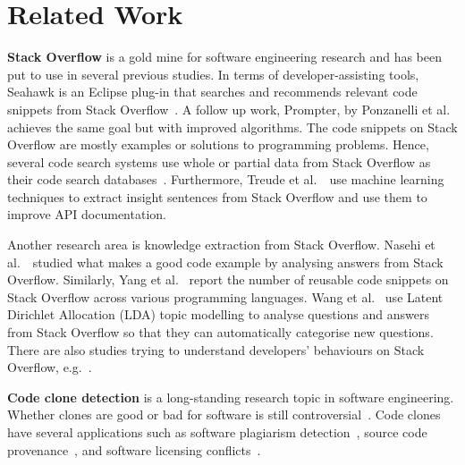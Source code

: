 \documentclass[sigconf,review, anonymous]{acmart}
\begin{document}

\section{Related Work}

\textbf{Stack Overflow} is a gold mine for software engineering
research and
has been put to
use in several previous studies. In terms of developer-assisting
tools, Seahawk is an Eclipse plug-in that searches and recommends
relevant code snippets from Stack Overflow~\cite{Ponzanelli2013}. A
follow up work, Prompter, by Ponzanelli et al.~\cite{Ponzanelli2014}
achieves the same goal but with improved algorithms. The code snippets
on Stack Overflow are mostly examples or solutions to programming
problems. Hence, several code search systems use whole or partial data
from Stack Overflow as their code search
databases~\cite{Keivanloo2014,Park2014,
  Stolee2014,Subramanian2013,Diamantopoulos2015}. Furthermore, Treude
et al.~\cite{Treude2016}~use machine learning techniques to extract
insight sentences from Stack Overflow and use them to improve API
documentation.

Another research area is knowledge extraction from Stack
Overflow. Nasehi et al.~\cite{Nasehi2012}~studied what makes a good
code example by analysing answers from Stack Overflow. Similarly, Yang
et al.~\cite{Yang2016} report the number of reusable code snippets on
Stack Overflow across various programming languages. Wang et
al.~\cite{Wang2013_StackOverflow} use Latent Dirichlet Allocation
(LDA) topic modelling to analyse questions and answers from Stack
Overflow so that they can automatically categorise new
questions. There are also studies trying to understand developers'
behaviours on Stack Overflow,
e.g.~\cite{Movshovitz-Attias2013,Rosen2016,Choetkiertikul2015,Bosu2013}.

\textbf{Code clone detection} is a long-standing research topic in
software engineering. Whether clones are good or bad for software is
still
controversial~\cite{Sajnani2016,Kapser2003,Kapser2008,Krinke2008,Hotta2010,Gode2011,Harder2013}.
Code clones have several
applications such as software plagiarism
detection~\cite{Prechelt2002}, source code
provenance~\cite{Davies2013}, and software licensing
conflicts~\cite{German2009}.
\end{document}
